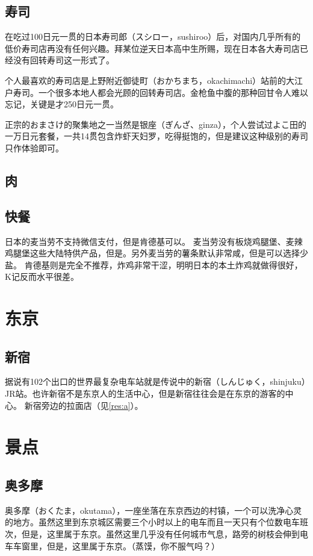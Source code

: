 \documentclass{article}
\begin{document}
\subsection{寿司}
在吃过100日元一贯的日本寿司郎（スシロー，sushiroo）后，对国内几乎所有的低价寿司店再没有任何兴趣。拜某位逆天日本高中生所赐，现在日本各大寿司店已经没有回转寿司这一形式了。\par
个人最喜欢的寿司店是上野附近御徒町（おかちまち，okachimachi）站前的大江户寿司。一个很多本地人都会光顾的回转寿司店。金枪鱼中腹的那种回甘令人难以忘记，关键是才250日元一贯。\par
正宗的おまさけ的聚集地之一当然是银座（ぎんざ、ginza），个人尝试过よこ田的一万日元套餐，一共14贯包含炸虾天妇罗，吃得挺饱的，但是建议这种级别的寿司只作体验即可。

\subsection{肉}

\subsection{快餐}
日本的麦当劳不支持微信支付，但是肯德基可以。
麦当劳没有板烧鸡腿堡、麦辣鸡腿堡这些大陆特供产品，但是。另外麦当劳的薯条默认非常咸，但是可以选择少盐。
肯德基则是完全不推荐，炸鸡非常干涩，明明日本的本土炸鸡就做得很好，K记反而水平很差。

\section{东京}
\subsection{新宿}
据说有102个出口的世界最复杂电车站就是传说中的新宿（しんじゅく，shinjuku）JR站。也许新宿不是东京人的生活中心，但是新宿往往会是在东京的游客的中心。
新宿旁边的拉面店（见\ref{res:a}）。

\section{景点}


\subsection{奥多摩}
奥多摩（おくたま，okutama），一座坐落在东京西边的村镇，一个可以洗净心灵的地方。虽然这里到东京城区需要三个小时以上的电车而且一天只有个位数电车班次，但是，这里属于东京。虽然这里几乎没有任何城市气息，路旁的树枝会伸到电车车窗里，但是，这里属于东京。（蒸馍，你不服气吗？）
\end{document}
